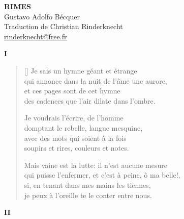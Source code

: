 \documentclass[a4paper,12pt]{book}
\begin{document}
\thispagestyle{empty}
\vspace*{70mm}
\begin{center}
{\Huge\textbf{RIMES}} \\
\vspace*{10mm}
{\Large Gustavo Adolfo Bécquer} \\
\vspace*{10mm}
Traduction de Christian Rinderknecht\\
\url{rinderknecht@free.fr}
\end{center}

\cleardoublepage

\frenchspacing  %

\begin{center}
  \textbf{I}
\end{center}

\settowidth{\versewidth}{qui puisse l'enfermer, et c'est à peine, ô ma belle!,}

\begin{verse}[\versewidth]
  Je sais un hymne géant et étrange \\
  qui annonce dans la nuit de l'âme une aurore, \\
  et ces pages sont de cet hymne \\
  des cadences que l'air dilate dans l'ombre.

  Je voudrais l'écrire, de l'homme \\
  domptant le rebelle, langue mesquine, \\
  avec des mots qui soient à la fois \\
  soupirs et rires, couleurs et notes.

  Mais vaine est la lutte: il n'est aucune mesure \\
  qui puisse l'enfermer, et c'est à peine, ô ma belle!, \\
  si, en tenant dans mes mains les tiennes, \\
  je peux à l'oreille te le conter entre nous.
\end{verse}

\bigskip

\begin{center}
  \textbf{II}
\end{center}

\settowidth{\versewidth}{où, tremblante, elle se plantera;}
\end{document}
